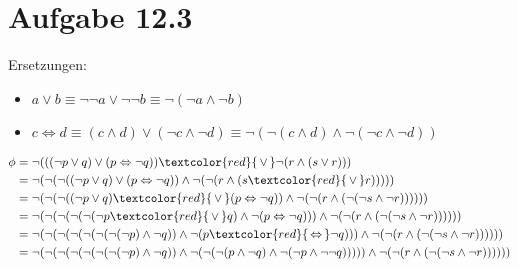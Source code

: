 \documentclass{article}
\begin{document}
	\section*{Aufgabe 12.3}
	Ersetzungen:
	\begin{itemize}
		\item $a\lor b\equiv \neg\neg a\lor\neg\neg b\equiv\neg(\neg a\land\neg b)$
		\item $c\Leftrightarrow d\equiv (c\land d)\lor(\neg c\land\neg d) \equiv \neg(\neg (c\land d)\land\neg (\neg c\land\neg d))$
	\end{itemize}
	\begin{align}
		\phi &= \neg(((\neg p\lor q)\lor(p\Leftrightarrow\neg q))\textcolor{red}{\,\lor\,}\neg(r\land(s\lor r))) \notag \\
		&= \neg(\neg(\neg ((\neg p\lor q)\lor(p\Leftrightarrow\neg q))\land\neg(\neg(r\land(s\textcolor{red}{\,\lor\,} r))))) \notag \\
		&= \neg(\neg(\neg ((\neg p\lor q)\textcolor{red}{\,\lor\,}(p\Leftrightarrow\neg q))\land\neg(\neg(r\land(\neg(\neg s\land\neg r)))))) \notag \\
		&= \neg(\neg(\neg (\neg(\neg (\neg p\textcolor{red}{\,\lor\,} q)\land\neg (p\Leftrightarrow\neg q)))\land\neg(\neg(r\land(\neg(\neg s\land\neg r)))))) \notag \\
		&= \neg(\neg(\neg (\neg(\neg (\neg(\neg (\neg p)\land\neg q))\land\neg (p\textcolor{red}{\,\Leftrightarrow\,}\neg q)))\land\neg(\neg(r\land(\neg(\neg s\land\neg r)))))) \notag \\
		&= \neg(\neg(\neg (\neg(\neg (\neg(\neg (\neg p)\land\neg q))\land\neg (\neg(\neg (p\land \neg q)\land\neg (\neg p\land\neg \neg q)))))\land\neg(\neg(r\land(\neg(\neg s\land\neg r)))))) \notag
	\end{align}
	
\end{document}
